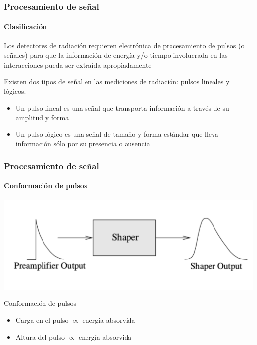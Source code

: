 \documentclass{beamer}
\begin{document}
\begin{frame}
\frametitle{Procesamiento de señal}
\framesubtitle{{\color{blue}Clasificación}}
\begin{block}{}
Los detectores de radiación requieren electrónica de procesamiento de pulsos (o
señales) para que la información de energía y/o tiempo involucrada en las
interacciones pueda ser extraída apropiadamente
\end{block}
\begin{block}{}
Existen dos tipos de señal en las mediciones de radiación: pulsos
{\color{blue}lineales} y {\color{blue}lógicos}. 
\begin{itemize}
\item Un {\color{blue}pulso lineal} es una señal que transporta información a través de su
\alert{amplitud} y \alert{forma}
\item Un {\color{blue}pulso lógico} es una señal de tamaño y forma estándar que lleva
información sólo por su \alert{presencia} o \alert{ausencia}
\end{itemize}
\end{block}
\end{frame} 

\begin{frame}
\frametitle{Procesamiento de señal}
\framesubtitle{{\color{blue}Conformación de pulsos}}
\begin{center}
\includegraphics[width=.8\textwidth]{d2/pulse_shaper} 
\end{center}
\begin{block}{Conformación de pulsos}
\begin{itemize}
\item Carga en el pulso $\propto$ energía absorvida
\item Altura del pulso $\propto$ energía absorvida
\end{itemize}
\end{block}
\end{frame} 
\end{document}
